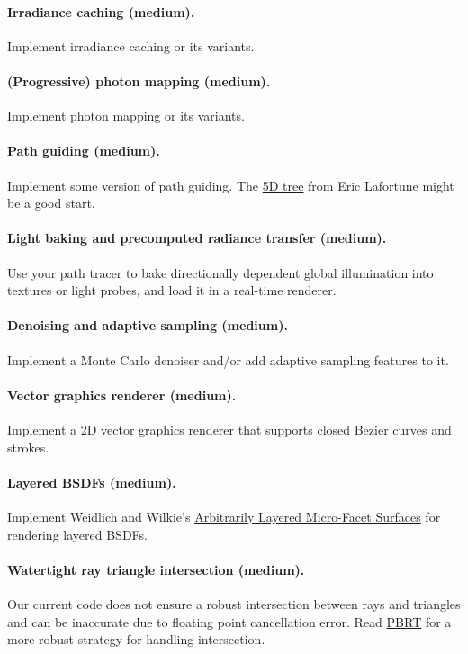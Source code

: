 \paragraph{Irradiance caching (medium).}
Implement irradiance caching or its variants.

\paragraph{(Progressive) photon mapping (medium).}
Implement photon mapping or its variants.

\paragraph{Path guiding (medium).}
Implement some version of path guiding. The \href{https://graphics.cs.kuleuven.be/publications/A5TTRTVOMCRT/index.html}{5D tree} from Eric Lafortune might be a good start.

\paragraph{Light baking and precomputed radiance transfer (medium).}
Use your path tracer to bake directionally dependent global illumination into textures or light probes, and load it in a real-time renderer.

\paragraph{Denoising and adaptive sampling (medium).}
Implement a Monte Carlo denoiser and/or add adaptive sampling features to it.

\paragraph{Vector graphics renderer (medium).}
Implement a 2D vector graphics renderer that supports closed Bezier curves and strokes.

\paragraph{Layered BSDFs (medium).}
Implement Weidlich and Wilkie's \href{https://www.cg.tuwien.ac.at/research/publications/2007/weidlich_2007_almfs/weidlich_2007_almfs-paper.pdf}{Arbitrarily Layered Micro-Facet Surfaces} for rendering layered BSDFs.

\paragraph{Watertight ray triangle intersection (medium).}
Our current code does not ensure a robust intersection between rays and triangles and can be inaccurate due to floating point cancellation error. Read \href{https://www.pbr-book.org/3ed-2018/Shapes/Managing_Rounding_Error}{PBRT} for a more robust strategy for handling intersection.

